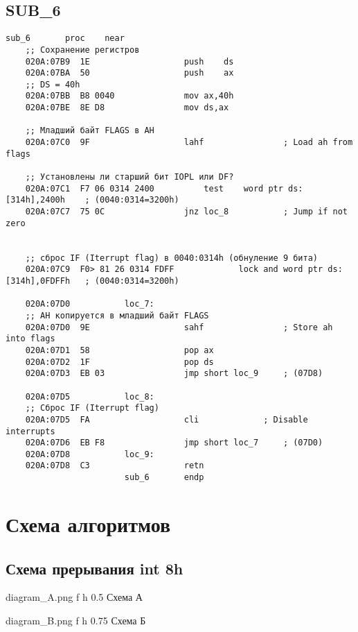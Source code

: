 \documentclass[a4paper,12pt]{bmstu}
\begin{document}
\section{SUB\_6}\label{sec:sub_6}
\begin{lstlisting}[style={asm},label={lst:SUB_6}]
                        sub_6		proc	near
    ;; Сохранение регистров
    020A:07B9  1E					push	ds
    020A:07BA  50					push	ax
    ;; DS = 40h
    020A:07BB  B8 0040				mov	ax,40h
    020A:07BE  8E D8				mov	ds,ax

    ;; Младший байт FLAGS в AH
    020A:07C0  9F					lahf				; Load ah from flags

    ;; Установлены ли старший бит IOPL или DF?
    020A:07C1  F7 06 0314 2400			test	word ptr ds:[314h],2400h	; (0040:0314=3200h)
    020A:07C7  75 0C				jnz	loc_8			; Jump if not zero


    ;; сброс IF (Iterrupt flag) в 0040:0314h (обнуление 9 бита)
    020A:07C9  F0> 81 26 0314 FDFF	           lock	and	word ptr ds:[314h],0FDFFh	; (0040:0314=3200h)

    020A:07D0			loc_7:
    ;; AH копируется в младший байт FLAGS
    020A:07D0  9E					sahf				; Store ah into flags
    020A:07D1  58					pop	ax
    020A:07D2  1F					pop	ds
    020A:07D3  EB 03				jmp	short loc_9		; (07D8)

    020A:07D5			loc_8:
    ;; Сброс IF (Iterrupt flag)
    020A:07D5  FA					cli				; Disable interrupts
    020A:07D6  EB F8				jmp	short loc_7		; (07D0)
    020A:07D8			loc_9:
    020A:07D8  C3					retn
                        sub_6		endp
\end{lstlisting}

\clearpage

\chapter{Схема алгоритмов}\label{ch:alg}
\section{Схема прерывания int 8h}\label{sec:int}
{diagram_A.png} %
{f} %
{h} %
{0.5\textwidth} %
{Схема А} %
\clearpage

{diagram_B.png} %
{f} %
{h} %
{0.75\textwidth} %
{Схема Б} %
\clearpage
\end{document}
